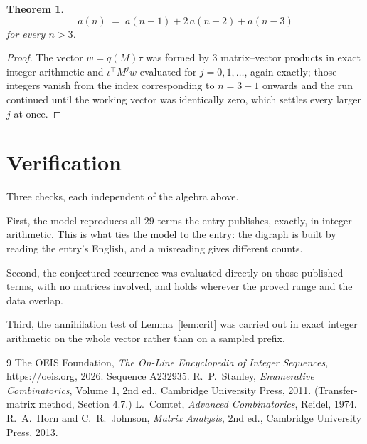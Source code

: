 \documentclass[11pt,a4paper]{article}
\theoremstyle{plain}
\newtheorem{theorem}{Theorem}
\theoremstyle{definition}
\begin{document}
\begin{theorem}
\[
a(n)\;=\;a(n-1) + 2\,a(n-2) + a(n-3)
\]
for every $n>3$.
\end{theorem}

\begin{proof}
The vector $w=q(M)\tau$ was formed by $3$ matrix--vector products in exact integer
arithmetic and $\iota^{\!\top}M^{j}w$ evaluated for $j=0,1,\dots$, again exactly; those
integers vanish from the index corresponding to $n=3+1$ onwards and the run continued
until the working vector was identically zero, which settles every larger $j$ at once.
\end{proof}

\section{Verification}

Three checks, each independent of the algebra above.

First, the model reproduces all $29$ terms the entry publishes, exactly, in integer
arithmetic. This is what ties the model to the entry: the digraph is built by reading the
entry's English, and a misreading gives different counts.

Second, the conjectured recurrence was evaluated directly on those published terms, with no
matrices involved, and holds wherever the proved range and the data overlap.

Third, the annihilation test of Lemma~\ref{lem:crit} was carried out in exact integer
arithmetic on the whole vector rather than on a sampled prefix.

\begin{thebibliography}{9}
 The OEIS Foundation, \emph{The On-Line Encyclopedia of Integer
Sequences}, \url{https://oeis.org}, 2026. Sequence A232935.
 R.~P.~Stanley, \emph{Enumerative Combinatorics}, Volume 1, 2nd ed.,
Cambridge University Press, 2011. (Transfer-matrix method, Section 4.7.)
 L.~Comtet, \emph{Advanced Combinatorics}, Reidel, 1974.
 R.~A.~Horn and C.~R.~Johnson, \emph{Matrix Analysis}, 2nd ed., Cambridge
University Press, 2013.
\end{thebibliography}
\end{document}
